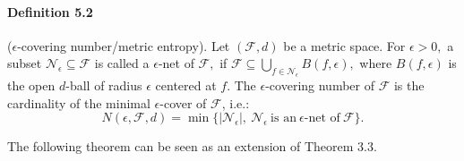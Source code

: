 \documentclass{article}
\begin{document}
\paragraph{Definition 5.2} ($\epsilon$-covering number/metric entropy). Let $(\mathcal{F},d)$ be a metric space. For $\epsilon >0,$ a subset $\mathcal{N}_\epsilon\subseteq\mathcal{F}$ is called a $\epsilon$-net of $\mathcal{F},$ if $\mathcal{F}\subseteq\bigcup_{f\in\mathcal{N}_\epsilon}B(f,\epsilon),$ where $B(f,\epsilon)$ is the open $d$-ball of radius $\epsilon$ centered at $f$. The $\epsilon$-covering number of $\mathcal{F}$ is the cardinality of the minimal $\epsilon$-cover of $\mathcal{F}$, i.e.:
\begin{equation*}
	N(\epsilon,\mathcal{F},d) = \min\{\vert\mathcal{N}_\epsilon\vert,\ \mathcal{N}_\epsilon\ \text{is an}\ \epsilon\text{-net of}\ \mathcal{F}\}.\tag{5.2}
\end{equation*}

The following theorem can be seen as an extension of Theorem 3.3.
\end{document}
